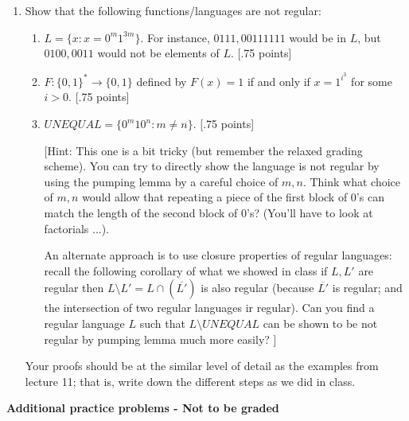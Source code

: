\documentclass[11pt]{article}
\begin{document}
\begin{enumerate}
\item Show that the following functions/languages are not regular: 
\begin{enumerate}
\item $L = \{x: x = 0^m 1^{3m}\}$. For instance, $0111, 00111111$ would be in $L$, but $0100, 0011$ would not be elements of $L$. [.75 points]

\item $F:\{0,1\}^* \rightarrow \{0,1\}$ defined by $F(x) = 1$ if and only if $x = 1^{i^3}$ for some $i > 0$. [.75 points]
\item $UNEQUAL = \{0^m 1 0^n: m \neq n\}$. [.75 points]

[Hint: This one is a bit tricky (but remember the relaxed grading scheme). You can try to directly show the language is not regular by using the pumping lemma by a careful choice of $m,n$. Think what choice of $m,n$ would allow that repeating a piece of the first block of $0$'s can match the length of the second block of $0$'s? (You'll have to look at factorials ...). 

An alternate approach is to use closure properties of regular languages: recall the following corollary of what we showed in class if $L, L'$ are regular then $L \setminus L' = L \cap (\overline{L'})$ is also regular (because $\overline{L'}$ is regular; and the intersection of two regular languages ir regular). Can you find a regular language $L$ such that $L \setminus UNEQUAL$ can be shown to be not regular by pumping lemma much more easily? ]
\end{enumerate}

 Your proofs should be at the similar level of detail as the examples from lecture 11; that is, write down the different steps as we did in class.
\end{enumerate}

{\bf Additional practice problems - Not to be graded}
\end{document}
